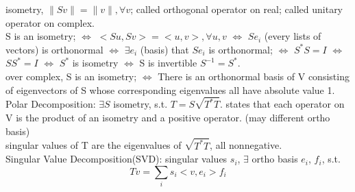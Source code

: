 \documentclass[paper=a4, fontsize=11pt]{scrartcl} %
\numberwithin{equation}{section} %
\numberwithin{figure}{section} %
\numberwithin{table}{section} %
\begin{document}
isometry, $\|Sv\|=\|v\|,\forall v$; called orthogonal operator on real; called unitary operator on complex.\\
S is an isometry; $\Leftrightarrow$ $<Su,Sv>=<u,v>,\forall u,v$ $\Leftrightarrow$ $Se_i$ (every lists of vectors) is orthonormal $\Leftrightarrow$ $\exists e_i$ (basis) that $Se_i$ is orthonormal; $\Leftrightarrow$ $S^*S=I$ $\Leftrightarrow$ $SS^*=I$ $\Leftrightarrow$ $S^*$ is isometry $\Leftrightarrow$ S is invertible $S^{-1}=S^*$.\\
over complex, S is an isometry; $\Leftrightarrow$ There is an orthonormal basis of V consisting of eigenvectors of S whose corresponding eigenvalues all have absolute value 1.\\
Polar Decomposition: $\exists S$ isometry, s.t. $T=S\sqrt{T^*T}$. states that each operator on V is the product of an isometry and a positive operator. (may different ortho basis)\\
singular values of T are the eigenvalues of $\sqrt{T^*T}$, all nonnegative.\\
Singular Value Decomposition(SVD): singular values $s_i$, $\exists$ ortho basis $e_i$, $f_i$, s.t.
\begin{equation}
	Tv=\sum_i s_i<v,e_i> f_i
\end{equation}
\end{document}
